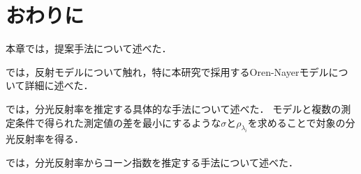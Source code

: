 \documentclass[../main]{subfiles}
\begin{document}
\section{おわりに}
\label{sec:pmethod_conclusion}

本章では，提案手法について述べた．

では，反射モデルについて触れ，特に本研究で採用するOren-Nayerモデルについて詳細に述べた．

では，分光反射率を推定する具体的な手法について述べた．
モデルと複数の測定条件で得られた測定値の差を最小にするような$\sigma$と$\rho_{\lambda_i}$を求めることで対象の分光反射率を得る．

では，分光反射率からコーン指数を推定する手法について述べた．
\end{document}
